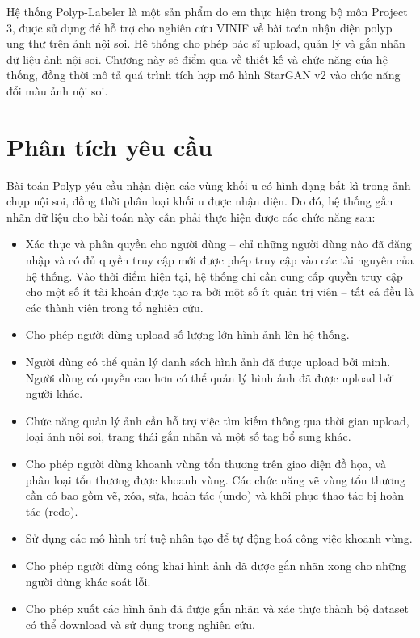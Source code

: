 \documentclass[12pt]{extreport}
\begin{document}
Hệ thống Polyp-Labeler là một sản phẩm do em thực hiện trong bộ môn Project 3, được sử dụng để hỗ trợ cho nghiên cứu VINIF về bài toán nhận diện polyp ung thư trên ảnh nội soi. Hệ thống cho phép bác sĩ upload, quản lý và gắn nhãn dữ liệu ảnh nội soi. Chương này sẽ điểm qua về thiết kế và chức năng của hệ thống, đồng thời mô tả quá trình tích hợp mô hình StarGAN v2 vào chức năng đổi màu ảnh nội soi.

\section{Phân tích yêu cầu}

Bài toán Polyp yêu cầu nhận diện các vùng khối u có hình dạng bất kì trong ảnh chụp nội soi, đồng thời phân loại khối u được nhận diện. Do đó, hệ thống gắn nhãn dữ liệu cho bài toán này cần phải thực hiện được các chức năng sau:
\begin{itemize}
    \item Xác thực và phân quyền cho người dùng – chỉ những người dùng nào đã đăng nhập và có đủ quyền truy cập mới được phép truy cập vào các tài nguyên của hệ thống. Vào thời điểm hiện tại, hệ thống chỉ cần cung cấp quyền truy cập cho một số ít tài khoản được tạo ra bởi một số ít quản trị viên – tất cả đều là các thành viên trong tổ nghiên cứu.
    \item Cho phép người dùng upload số lượng lớn hình ảnh lên hệ thống.
    \item Người dùng có thể quản lý danh sách hình ảnh đã được upload bởi mình. Người dùng có quyền cao hơn có thể quản lý hình ảnh đã được upload bởi người khác.
    \item Chức năng quản lý ảnh cần hỗ trợ việc tìm kiếm thông qua thời gian upload, loại ảnh nội soi, trạng thái gắn nhãn và một số tag bổ sung khác.
    \item Cho phép người dùng khoanh vùng tổn thương trên giao diện đồ họa, và phân loại tổn thương được khoanh vùng. Các chức năng vẽ vùng tổn thương cần có bao gồm vẽ, xóa, sửa, hoàn tác (undo) và khôi phục thao tác bị hoàn tác (redo).
    \item Sử dụng các mô hình trí tuệ nhân tạo để tự động hoá công việc khoanh vùng.
    \item Cho phép người dùng công khai hình ảnh đã được gắn nhãn xong cho những người dùng khác soát lỗi.
    \item Cho phép xuất các hình ảnh đã được gắn nhãn và xác thực thành bộ dataset có thể download và sử dụng trong nghiên cứu.
\end{itemize}
\end{document}
